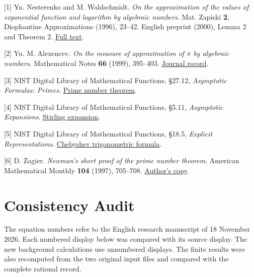 \documentclass[11pt,a4paper]{article}
\begin{document}
{[}1{]} Yu. Nesterenko and M. Waldschmidt. \emph{On the approximation of the values of exponential function and logarithm by algebraic numbers}. Mat. Zapiski \textbf{2}, Diophantine Approximations (1996), 23--42. English preprint (2000), Lemma 2 and Theorem 2. \href{https://arxiv.org/pdf/math/0002047}{Full text}.

{[}2{]} Yu. M. Alexencev. \emph{On the measure of approximation of \(\pi\) by algebraic numbers}. Mathematical Notes \textbf{66} (1999), 395--403. \href{https://www.mathnet.ru/eng/mzm1191}{Journal record}.

{[}3{]} NIST Digital Library of Mathematical Functions, §27.12, \emph{Asymptotic Formulas: Primes}. \href{https://dlmf.nist.gov/27.12}{Prime number theorem}.

{[}4{]} NIST Digital Library of Mathematical Functions, §5.11, \emph{Asymptotic Expansions}. \href{https://dlmf.nist.gov/5.11.E1}{Stirling expansion}.

{[}5{]} NIST Digital Library of Mathematical Functions, §18.5, \emph{Explicit Representations}. \href{https://dlmf.nist.gov/18.5.E1}{Chebyshev trigonometric formula}.

{[}6{]} D. Zagier. \emph{Newman's short proof of the prime number theorem}. American Mathematical Monthly \textbf{104} (1997), 705--708. \href{https://people.mpim-bonn.mpg.de/zagier/files/doi/10.2307/2975232/fulltext.pdf}{Author's copy}.

\section{Consistency Audit}\label{consistency-audit}

The equation numbers refer to the English research manuscript of 18 November 2026. Each numbered display below was compared with its source display. The new background calculations use unnumbered displays. The finite results were also recomputed from the two original input files and compared with the complete rational record.
\end{document}
